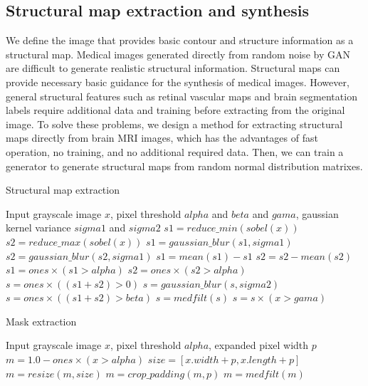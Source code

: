 \documentclass[runningheads]{llncs}
\begin{document}
	\subsection{Structural map extraction and synthesis}
	We define the image that provides basic contour and structure information as a structural map. Medical images generated directly from random noise by GAN are difficult to generate realistic structural information. Structural maps can provide necessary basic guidance for the synthesis of medical images. However, general structural features such as retinal vascular maps\cite{41costa2017towards} and brain segmentation labels \cite{4shin2018medical}require additional data and training before extracting from the original image. To solve these problems, we design a method for extracting structural maps directly from brain MRI images, which has the advantages of fast operation, no training, and no additional required data. Then, we can train a generator to generate structural maps from random normal distribution matrixes.
	\begin{algorithm}[thbp!]
		\caption{Structural map extraction}
		\label{alg:1}
		\begin{multicols}{2}
			\begin{algorithmic}[1]
				\State Input grayscale image $x$,
				pixel threshold $alpha$ and $beta$ and $gama$,
				gaussian kernel variance $sigma1$ and $sigma2$
				\State $s1 = reduce\_min(sobel(x))$
				\State $s2 = reduce\_max(sobel(x))$
				\State $s1 = gaussian\_blur(s1,sigma1)$
				\State $s2 = gaussian\_blur(s2,sigma1)$
				\State $s1 = mean(s1) - s1$
				\State $s2 = s2 - mean(s2)$
				\State $s1 = ones \times (s1 > alpha)$
				\State $s2 = ones \times (s2 > alpha)$
				\State $s = ones \times ((s1 + s2)> 0)$
				\State $s = gaussian\_blur(s,sigma2)$
				\State $s = ones \times ((s1 + s2)> beta)$
				\State $s = medfilt(s)$
				\State $s = s \times (x > gama)$
			\end{algorithmic}  
		\end{multicols}
	\end{algorithm}
	\begin{algorithm}[thbp!]
	\caption{Mask extraction}
	\label{alg:2}
	\setstretch{0.85}
	\begin{multicols}{2}
		\begin{algorithmic}[1]
			\State Input grayscale image $x$, pixel threshold $alpha$, expanded pixel width $p$
			\State $m = 1.0 - ones \times (x > alpha)$
			\State $size=[x.width+p, x.length+p]$
			\State $m = resize(m, size)$
			\State $m = crop\_padding(m,p)$
			\State $m = medfilt(m)$
		\end{algorithmic}  
	\end{multicols}
	\end{algorithm}
\end{document}
